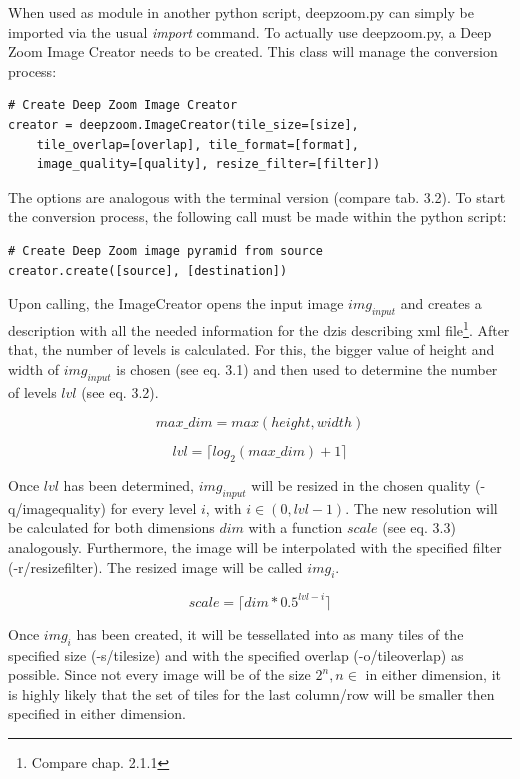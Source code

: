When used as module in another python script, deepzoom.py can simply be imported via the usual \emph{import} command. To actually use deepzoom.py, a Deep Zoom Image Creator needs to be created. This class will manage the conversion process:

\begin{lstlisting}[frame=single]
# Create Deep Zoom Image Creator
creator = deepzoom.ImageCreator(tile_size=[size], 
	tile_overlap=[overlap],	tile_format=[format], 
	image_quality=[quality], resize_filter=[filter])
\end{lstlisting}

The options are analogous with the terminal version (compare tab. 3.2). To start the conversion process, the following call must be made within the python script:

\begin{lstlisting}[frame=single]
# Create Deep Zoom image pyramid from source
creator.create([source], [destination])
\end{lstlisting}

Upon calling, the ImageCreator opens the input image $img_{input}$ and creates a description with all the needed information for the dzis describing xml file\footnote{Compare chap. 2.1.1}. After that, the number of levels is calculated. For this, the bigger value of height and width of $img_{input}$ is chosen (see eq. 3.1) and then used to determine the number of levels $lvl$ (see eq. 3.2).

\begin{equation}
	max{\_}dim = max(height, width)
\end{equation}

\begin{equation}
	lvl = {\lceil}log_2(max{\_}dim) + 1\rceil
\end{equation}

Once $lvl$ has been determined, $img_{input}$ will be resized in the chosen quality (-q/image{\textunderscore}quality) for every level $i$, with $i \in (0, lvl-1)$. The new resolution will be calculated for both dimensions $dim$ with a function $scale$ (see eq. 3.3) analogously. Furthermore, the image will be interpolated with the specified filter (-r/resize{\textunderscore}filter). The resized image will be called $img_i$.

\begin{equation}
	scale = {\lceil}dim * 0.5^{lvl-i}\rceil
\end{equation}

Once $img_i$ has been created, it will be tessellated into as many tiles of the specified size (-s/tile{\textunderscore}size) and with the specified overlap (-o/tile{\textunderscore}overlap) as possible. Since not every image will be of the size $2^n, n \in $ in either dimension, it is highly likely that the set of tiles for the last column/row will be smaller then specified in either dimension.

